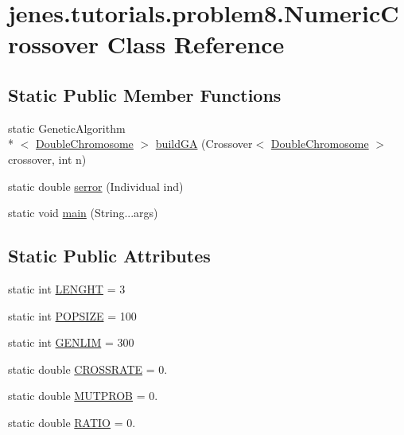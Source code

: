\hypertarget{classjenes_1_1tutorials_1_1problem8_1_1_numeric_crossover}{\section{jenes.\-tutorials.\-problem8.\-Numeric\-Crossover Class Reference}
\label{classjenes_1_1tutorials_1_1problem8_1_1_numeric_crossover}
}
\subsection*{Static Public Member Functions}
\begin{DoxyCompactItemize}
\item 
static Genetic\-Algorithm\\*
$<$ \hyperlink{classjenes_1_1chromosome_1_1_double_chromosome}{Double\-Chromosome} $>$ \hyperlink{classjenes_1_1tutorials_1_1problem8_1_1_numeric_crossover_a8af3f285354dc96e81647a03d76d93c5}{build\-G\-A} (Crossover$<$ \hyperlink{classjenes_1_1chromosome_1_1_double_chromosome}{Double\-Chromosome} $>$ crossover, int n)
\item 
static double \hyperlink{classjenes_1_1tutorials_1_1problem8_1_1_numeric_crossover_aef1de8d283010a790fb20661fae423f2}{serror} (Individual ind)
\item 
static void \hyperlink{classjenes_1_1tutorials_1_1problem8_1_1_numeric_crossover_a11da9d09414921591a53cddb601cc203}{main} (String...\-args)
\end{DoxyCompactItemize}
\subsection*{Static Public Attributes}
\begin{DoxyCompactItemize}
\item 
static int \hyperlink{classjenes_1_1tutorials_1_1problem8_1_1_numeric_crossover_af73d636c488b92bf3ae33d19d1f5f5e7}{L\-E\-N\-G\-H\-T} = 3
\item 
static int \hyperlink{classjenes_1_1tutorials_1_1problem8_1_1_numeric_crossover_a0a9b3b839ab6677dcbae723434df6551}{P\-O\-P\-S\-I\-Z\-E} = 100
\item 
static int \hyperlink{classjenes_1_1tutorials_1_1problem8_1_1_numeric_crossover_a5e45487dcf5730d7c628ca85b21160dc}{G\-E\-N\-L\-I\-M} = 300
\item 
static double \hyperlink{classjenes_1_1tutorials_1_1problem8_1_1_numeric_crossover_ae4fcf3a595e386c6aeec443dedaba83f}{C\-R\-O\-S\-S\-R\-A\-T\-E} = 0.
\item 
static double \hyperlink{classjenes_1_1tutorials_1_1problem8_1_1_numeric_crossover_a4d0587e4b39b1f74efd20a0c921c38f7}{M\-U\-T\-P\-R\-O\-B} = 0.
\item 
static double \hyperlink{classjenes_1_1tutorials_1_1problem8_1_1_numeric_crossover_ae3c1d4871321a6323d09add505679fe0}{R\-A\-T\-I\-O} = 0.
\end{DoxyCompactItemize}


